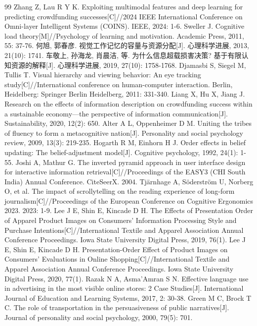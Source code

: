 \begin{thebibliography}{99}
 Zhang Z, Lau R Y K. Exploiting multimodal features and deep learning for predicting crowdfunding successes[C]//2024 IEEE International Conference on Omni-layer Intelligent Systems (COINS). IEEE, 2024: 1-6.
 Sweller J. Cognitive load theory[M]//Psychology of learning and motivation. Academic Press, 2011, 55: 37-76.
 何旭, 郭春彦. 视觉工作记忆的容量与资源分配[J]. 心理科学进展, 2013, 21(10): 1741.
 车敬上, 孙海龙, 肖晨洁, 等. 为什么信息超载损害决策? 基于有限认知资源的解释[J]. 心理科学进展, 2019, 27(10): 1758-1768.
 Djamasbi S, Siegel M, Tullis T. Visual hierarchy and viewing behavior: An eye tracking study[C]//International conference on human-computer interaction. Berlin, Heidelberg: Springer Berlin Heidelberg, 2011: 331-340.
 Liang X, Hu X, Jiang J. Research on the effects of information description on crowdfunding success within a sustainable economy—the perspective of information communication[J]. Sustainability, 2020, 12(2): 650.
 Alter A L, Oppenheimer D M. Uniting the tribes of fluency to form a metacognitive nation[J]. Personality and social psychology review, 2009, 13(3): 219-235.
 Hogarth R M, Einhorn H J. Order effects in belief updating: The belief-adjustment model[J]. Cognitive psychology, 1992, 24(1): 1-55.
 Joshi A, Mathur G. The inverted pyramid approach in user interface design for interactive information retrieval[C]//Proceedings of the EASY3 (CHI South India) Annual Conference. CiteSeerX. 2004.
 Tjärnhage A, Söderström U, Norberg O, et al. The impact of scrollytelling on the reading experience of long-form journalism[C]//Proceedings of the European Conference on Cognitive Ergonomics 2023. 2023: 1-9.
 Lee J E, Shin E, Kincade D H. The Effects of Presentation Order of Apparel Product Images on Consumers’ Information Processing Style and Purchase Intentions[C]//International Textile and Apparel Association Annual Conference Proceedings. Iowa State University Digital Press, 2019, 76(1).
 Lee J E, Shin E, Kincade D H. Presentation-Order Effect of Product Images on Consumers’ Evaluations in Online Shopping[C]//International Textile and Apparel Association Annual Conference Proceedings. Iowa State University Digital Press, 2020, 77(1).
 Razak N A, Asma’Amran S N. Effective language use in advertising in the most visible online stores: 2 Case Studies[J]. International Journal of Education and Learning Systems, 2017, 2: 30-38.
 Green M C, Brock T C. The role of transportation in the persuasiveness of public narratives[J]. Journal of personality and social psychology, 2000, 79(5): 701.

\end{thebibliography}
